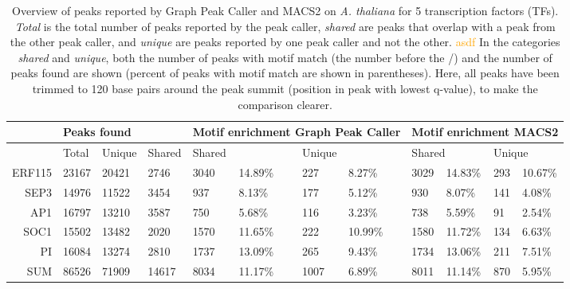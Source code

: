 \documentclass[10pt,letterpaper]{article}
\newcommand{\revision}[1]{\textcolor{orange}{#1}}
\begin{document}
\begin{table}[]
\begin{adjustwidth}{-2.45in}{0in} %
\centering
\caption{Overview of peaks reported by Graph Peak Caller and MACS2 on \emph{A. thaliana} for 5 transcription factors (TFs).
  \emph{Total} is the total number of peaks reported by the peak caller,
  \emph{shared} are peaks that overlap with a peak from the other peak caller, and \emph{unique} are peaks reported by one peak caller and not the other. \revision{asdf}
  In the categories \emph{shared} and \emph{unique}, both the number of peaks with motif match (the number before the /) and the number of peaks found are shown (percent of peaks with motif match are shown in parentheses).
  Here, all peaks have been trimmed to 120 base pairs around the peak summit (position in peak with lowest q-value), to make the comparison clearer.}
\label{table2}
\begin{tabular}{llllllllllll}
\toprule
 & \multicolumn{3}{|l|}{Peaks found} & \multicolumn{4}{l|}{Motif enrichment Graph Peak Caller}                        & \multicolumn{4}{l}{Motif enrichment MACS2}                       \\ \midrule
 &   \multicolumn{1}{|l}{Total}    &  Unique      &  Shared     & \multicolumn{2}{|l}{Shared} & \multicolumn{2}{l|}{Unique} & \multicolumn{2}{l}{Shared} & \multicolumn{2}{l}{Unique} \\ \midrule
\multicolumn{1}{r|}{ERF115} & 23167 & 20421 & 2746 & \multicolumn{1}{|l}{3040} & 14.89\% & 227 & 8.27\% & \multicolumn{1}{|l}{3029} & 14.83\% & 293 & 10.67\%\\ 
\multicolumn{1}{r|}{SEP3} & 14976 & 11522 & 3454 & \multicolumn{1}{|l}{937} & 8.13\% & 177 & 5.12\% & \multicolumn{1}{|l}{930} & 8.07\% & 141 & 4.08\%\\ 
\multicolumn{1}{r|}{AP1} & 16797 & 13210 & 3587 & \multicolumn{1}{|l}{750} & 5.68\% & 116 & 3.23\% & \multicolumn{1}{|l}{738} & 5.59\% & 91 & 2.54\%\\ 
\multicolumn{1}{r|}{SOC1} & 15502 & 13482 & 2020 & \multicolumn{1}{|l}{1570} & 11.65\% & 222 & 10.99\% & \multicolumn{1}{|l}{1580} & 11.72\% & 134 & 6.63\%\\ 
\multicolumn{1}{r|}{PI} & 16084 & 13274 & 2810 & \multicolumn{1}{|l}{1737} & 13.09\% & 265 & 9.43\% & \multicolumn{1}{|l}{1734} & 13.06\% & 211 & 7.51\%\\ 
\multicolumn{1}{r|}{SUM} & 86526 & 71909 & 14617 & \multicolumn{1}{|l}{8034} & 11.17\% & 1007 & 6.89\% & \multicolumn{1}{|l}{8011} & 11.14\% & 870 & 5.95\%\\ 
\end{tabular}
\end{adjustwidth}
\end{table}
\end{document}

